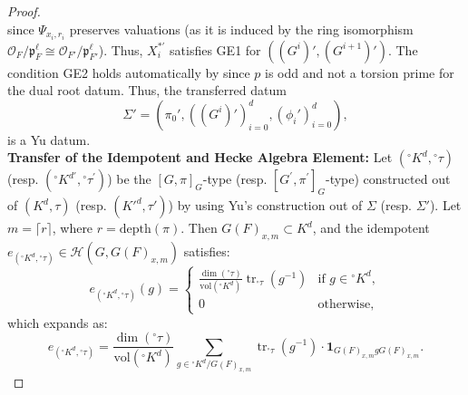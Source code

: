 \documentclass[american]{article}
\numberwithin{equation}{section}
\numberwithin{figure}{section}
\theoremstyle{plain}
\theoremstyle{definition}
\theoremstyle{remark}
\DeclareMathOperator{\tr}{tr}
\begin{document}
\begin{proof}
\[  \]
since \(\Psi_{x_i, r_i}\) preserves valuations (as it is induced by the ring isomorphism \(\mathcal{O}_F / \mathfrak{p}_F^\ell \cong \mathcal{O}_{F'} / \mathfrak{p}_{F'}^\ell\)). Thus, \(X^{*\prime}_i\) satisfies GE1 for \(((G^i)', (G^{i+1})')\). The condition GE2 holds automatically by \cite[Lemma 8.1]{Yu2001} since \(p\) is odd and not a torsion prime for the dual root datum.
Thus, the transferred datum
\[
\Sigma' = (\pi_0', ((G^i)')_{i=0}^d, (\phi_i')_{i=0}^d),
\]
is a Yu datum.
\vspace{1em}
\\
\textbf{Transfer of the Idempotent and Hecke Algebra Element:}
Let \(({}^{\circ}K^{d},{}^{\circ}\tau)\) (resp. \(({}^{\circ}K^{d\prime},{}^{\circ}\tau^\prime)\)) be the \([G,\pi]_G\)-type (resp. \([G^\prime,\pi^\prime]_G\)-type)  constructed out of \((K^{d},\tau)\) (resp. \((K'^{d},\tau')\)) by using Yu's construction out of \(\Sigma\) (resp. \(\Sigma'\)). 
Let \(m = \lceil r \rceil\), where \(r = \mathrm{depth}(\pi)\). Then \(G(F)_{x,m} \subset K^d\), and the idempotent \(e_{({}^{\circ}K^{d}, {}^{\circ}\tau)} \in \mathscr{H}(G, G(F)_{x,m})\) satisfies:
\[
e_{({}^{\circ}K^{d}, {}^{\circ}\tau)}(g) = 
\begin{cases}
\frac{\dim({}^{\circ}\tau)}{\mathrm{vol}({}^{\circ}K^{d})} \tr_{{}^{\circ}\tau}(g^{-1}) & \text{if } g \in {}^{\circ}K^{d}, \\
0 & \text{otherwise},
\end{cases}
\]
which expands as:
\[
e_{({}^{\circ}K^{d}, {}^{\circ}\tau)} = 
\frac{\dim({}^{\circ}\tau)}{\mathrm{vol}({}^{\circ}K^{d})} 
\sum_{g \in {}^{\circ}K^{d} / G(F)_{x,m}} 
\tr_{{}^{\circ}\tau}(g^{-1}) \cdot \mathbf{1}_{G(F)_{x,m} g G(F)_{x,m}}.
\]


\end{proof}
\end{document}
